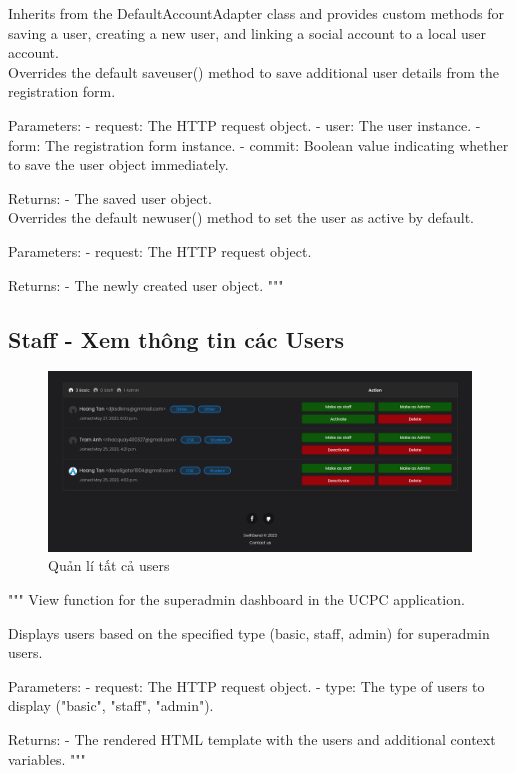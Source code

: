 \documentclass[paper=a4wide, fontsize=12pt]{scrartcl}	 %
\begin{document}
    Inherits from the DefaultAccountAdapter class and provides custom methods for saving a user,
    creating a new user, and linking a social account to a local user account. \\


    Overrides the default saveuser() method to save additional user details from the registration form.

        Parameters:
        - request: The HTTP request object.
        - user: The user instance.
        - form: The registration form instance.
        - commit: Boolean value indicating whether to save the user object immediately.

        Returns:
        - The saved user object. \\


        Overrides the default newuser() method to set the user as active by default.

        Parameters:
        - request: The HTTP request object.

        Returns:
        - The newly created user object.
"""

\subsection{Staff - Xem thông tin các Users}
\begin{figure}[H]
    \centering
    \includegraphics[scale=0.4]{demo/view_users.png}
    \caption{Quản lí tất cả users}
\end{figure}

"""
    View function for the superadmin dashboard in the UCPC application.

    Displays users based on the specified type (basic, staff, admin) for superadmin users.

    Parameters:
    - request: The HTTP request object.
    - type: The type of users to display ("basic", "staff", "admin").

    Returns:
    - The rendered HTML template with the users and additional context variables.
    """
\end{document}
